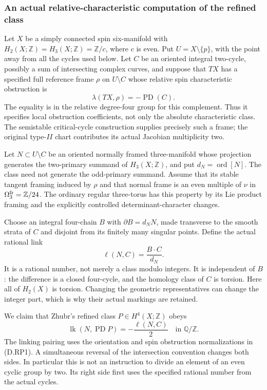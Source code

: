 \subsubsection*{An actual relative-characteristic computation of the refined class}

Let $X$ be a simply connected spin six-manifold with
$H_2(X;\mathbb Z)=H_3(X;\mathbb Z)=\mathbb Z/c$, where $c$ is even.
Put $U=X\setminus\{p\}$, with the point away from all the cycles
used below. Let $C$ be an oriented integral two-cycle, possibly a
sum of intersecting complex curves, and suppose that $TX$ has a
specified full reference frame $\rho$ on $U\setminus C$ whose
relative spin characteristic obstruction is
\[
                     \lambda(TX,\rho)=-\operatorname{PD}(C).
\tag{D.RP1}
\]
The equality is in the relative degree-four group for this
complement. Thus it specifies local obstruction coefficients,
not only the absolute characteristic class. The semistable
critical-cycle construction supplies precisely such a frame;
the original type-$II$ chart contributes its actual Jacobian
multiplicity two.

Let $N\subset U\setminus C$ be an oriented normally framed
three-manifold whose projection generates the two-primary
summand of $H_3(X;\mathbb Z)$, and put $d_N=\operatorname{ord}[N]$.
The class need not generate the odd-primary summand. Assume
that its stable tangent framing induced by $\rho$ and that
normal frame is an even multiple of $\nu$ in
$\Omega^{\rm fr}_3=\mathbb Z/24$. The ordinary regular three-torus
has this property by its Lie product framing and the explicitly
controlled determinant-character changes.

Choose an integral four-chain $B$ with $\partial B=d_NN$, made
transverse to the smooth strata of $C$ and disjoint from its
finitely many singular points. Define the actual rational link
\[
                         \ell(N,C)=\frac{B\cdot C}{d_N}.
\tag{D.RP2}
\]
It is a rational number, not merely a class modulo integers.
It is independent of $B$: the difference is a closed four-cycle,
and the homology class of $C$ is torsion. Here all of $H_2(X)$
is torsion. Changing the geometric representatives can change
the integer part, which is why their actual markings are retained.

We claim that Zhubr's refined class $P\in H^4(X;\mathbb Z)$ obeys
\[
                  \operatorname{lk}(N,\operatorname{PD}P)
                    =-\frac{\ell(N,C)}2\quad\text{in }\mathbb Q/\mathbb Z.
\tag{D.RP3}
\]
The linking pairing uses the orientation and spin obstruction
normalizations in (D.RP1). A simultaneous reversal of the
intersection convention changes both sides. In particular this
is not an instruction to divide an element of an even cyclic
group by two. Its right side first uses the specified rational
number from the actual cycles.

